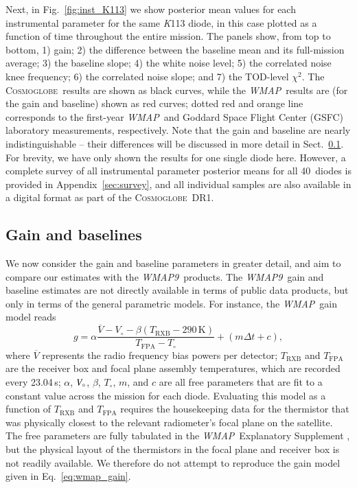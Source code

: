 \documentclass[twocolumn]{../../common/aa}
\def\WMAP{\emph{WMAP}}
\def\WMAPnine{\emph{WMAP9}}
\newcommand{\cosmoglobe}{\textsc{Cosmoglobe}}
\newcommand{\K}[0]{\textit K}
\newcommand{\V}[0]{\textit V}
\begin{document}
Next, in Fig.~\ref{fig:inst_K113} we show posterior mean values for each instrumental parameter for the same \K113 diode, in this case plotted as a function of time throughout the entire mission. The panels show, from top to bottom, 1) gain; 2) the difference between the baseline mean and its full-mission average; 3) the baseline slope; 4) the white noise level; 5) the correlated noise knee frequency; 6) the correlated noise slope; and 7) the TOD-level $\chi^2$. The \cosmoglobe\ results are shown as black curves, while the \WMAP\ results are (for the gain and baseline) shown as red curves; dotted red and orange line corresponds to the first-year \WMAP\ and Goddard Space Flight Center (GSFC) laboratory measurements, respectively. Note that the gain and baseline are nearly indistinguishable -- their differences will be discussed in more detail in Sect.~\ref{sec:gain}. For brevity, we have only shown the results for one single diode here. However, a complete survey of all instrumental parameter posterior means for all 40~diodes is provided in Appendix~\ref{sec:survey}, and all individual samples are also available in a digital format as part of the \cosmoglobe\ DR1. 


\subsection{Gain and baselines}
\label{sec:gain}

We now consider the gain and baseline parameters in greater detail, and aim to compare our estimates with the \WMAPnine\ products. The \WMAPnine\ gain and baseline estimates are not directly available in terms of public data products, but only in terms of the general parametric models. For instance, the \WMAP\ gain model reads \citep{wmapexsupp}
\begin{equation}
	\label{eq:wmap_gain}
	g=\alpha\frac{\overline V-V_\circ-\beta(T_\mathrm{RXB}-290\,\mathrm K)}
	{T_\mathrm{FPA}-T_\circ}+(m\Delta t+c),
\end{equation}
where $\overline V$ represents the radio frequency bias powers per detector; $T_\mathrm{RXB}$ and $T_\mathrm{FPA}$ are the receiver box and focal plane assembly temperatures, which are recorded every 23.04\,s; $\alpha$, $\V_\circ$, $\beta$, $T_\circ$, $m$, and $c$ are all free parameters that are fit to a constant value across the mission for each diode. Evaluating this model as a function of $T_\mathrm{RXB}$ and $T_\mathrm{FPA}$ requires the housekeeping data for the thermistor that was physically closest to the relevant radiometer's focal plane on the satellite. The free parameters are fully tabulated in the \WMAP\ Explanatory Supplement \citep{wmapexsupp}, but the physical layout of the thermistors in the focal plane and receiver box is not readily available. We therefore do not attempt to reproduce the gain model given in Eq.~\eqref{eq:wmap_gain}.
\end{document}
